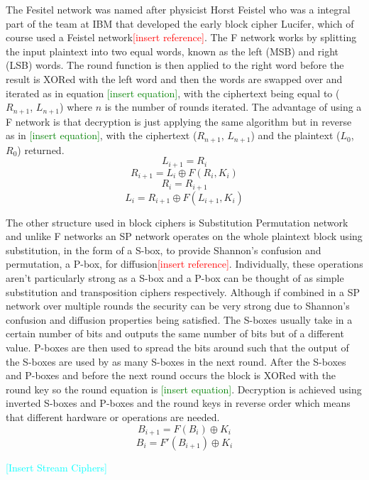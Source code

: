 \documentclass[12pt,twoside,a4paper]{report}
\begin{document}
    The Fesitel network was named after physicist Horst Feistel who was a integral part of the team at IBM that developed the early block cipher Lucifer, which of course used a Feistel network\textcolor{red}{[insert reference]}. The F network works by splitting the input plaintext into two equal words, known as the left (MSB) and right (LSB) words. The round function is then applied to the right word before the result is XORed with the left word and then the words are swapped over and iterated as in equation \textcolor{green}{[insert equation]}, with the ciphertext being equal to ($R_{n+1}$, $L_{n+1}$) where $n$ is the number of rounds iterated. The advantage of using a F network is that decryption is just applying the same algorithm but in reverse as in \textcolor{green}{[insert equation]}, with the ciphertext ($R_{n+1}$, $L_{n+1}$) and the plaintext ($L_0$, $R_0$) returned.
    \[L_{i+1} = R_i\]
    \[R_{i+1} = L_i \oplus F(R_i, K_i)\]
    \[R_i = R_{i+1}\]
    \[L_i = R_{i+1} \oplus F(L_{i+1}, K_i)\]
    
    The other structure used in block ciphers is Substitution Permutation network and unlike F networks an SP network operates on the whole plaintext block using substitution, in the form of a S-box, to provide Shannon's confusion and permutation, a P-box, for diffusion\textcolor{red}{[insert reference]}. Individually, these operations aren't particularly strong as a S-box and a P-box can be thought of as simple substitution and transposition ciphers respectively. Although if combined in a SP network over multiple rounds the security can be very strong due to Shannon's confusion and diffusion properties being satisfied. The S-boxes usually take in a certain number of bits and outputs the same number of bits but of a different value. P-boxes are then used to spread the bits around such that the output of the S-boxes are used by as many S-boxes in the next round. After the S-boxes and P-boxes and before the next round occurs the block is XORed with the round key so the round equation is \textcolor{green}{[insert equation]}. Decryption is achieved using inverted S-boxes and P-boxes and the round keys in reverse order which means that different hardware or operations are needed.
    \[B_{i+1} = F(B_i) \oplus K_i\]
    \[B_i = F'(B_{i+1}) \oplus K_i\] 
    
    \textcolor{cyan}{[Insert Stream Ciphers]}
    
\end{document}
